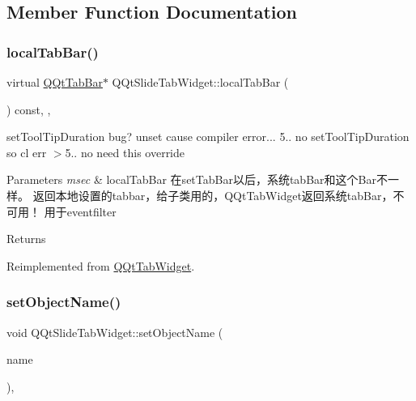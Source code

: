\subsection{Member Function Documentation}
\mbox{\label{class_q_qt_slide_tab_widget_a7e4513d3f457ba2e56a8211ac627a25d}} 
\subsubsection{\texorpdfstring{local\+Tab\+Bar()}{localTabBar()}}
{\footnotesize\ttfamily virtual \mbox{\hyperlink{class_q_qt_tab_bar}{Q\+Qt\+Tab\+Bar}}$\ast$ Q\+Qt\+Slide\+Tab\+Widget\+::local\+Tab\+Bar (\begin{DoxyParamCaption}{ }\end{DoxyParamCaption}) const\hspace{0.3cm}{\ttfamily [inline]}, {\ttfamily [override]}, {\ttfamily [virtual]}}



set\+Tool\+Tip\+Duration bug? unset cause compiler error... 5.. no set\+Tool\+Tip\+Duration so cl err $>$5.. no need this override 


\begin{DoxyParams}{Parameters}
{\em msec} & local\+Tab\+Bar 在set\+Tab\+Bar以后，系统tab\+Bar和这个\+Bar不一样。 返回本地设置的tabbar，给子类用的，\+Q\+Qt\+Tab\+Widget返回系统tab\+Bar，不可用！ 用于eventfilter \\
\hline
\end{DoxyParams}
\begin{DoxyReturn}{Returns}

\end{DoxyReturn}


Reimplemented from \mbox{\hyperlink{class_q_qt_tab_widget_a53183c40775ba6e7142f429edfd75d9c}{Q\+Qt\+Tab\+Widget}}.

\mbox{\label{class_q_qt_slide_tab_widget_a6c263512e6174b8020508cc4f1f86ff9}} 
\subsubsection{\texorpdfstring{set\+Object\+Name()}{setObjectName()}}
{\footnotesize\ttfamily void Q\+Qt\+Slide\+Tab\+Widget\+::set\+Object\+Name (\begin{DoxyParamCaption}\item[{const Q\+String \&}]{name }\end{DoxyParamCaption})\hspace{0.3cm}{\ttfamily [override]}, {\ttfamily [virtual]}}



